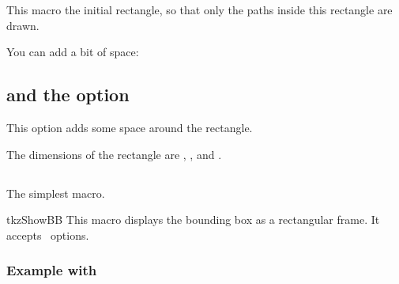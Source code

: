 This macro  the initial rectangle, so that only the paths inside this rectangle are drawn.

\begin{tkzexample}[latex=8cm,small]
\end{tkzexample} 

You can add a bit of space:
\begin{tkzltxexample}[]
  \tkzClip[space=1]
\end{tkzltxexample} 

\subsection{ and the option } 
This option adds some space around the  rectangle.
\begin{tkzexample}[latex=8cm,small]
\end{tkzexample}   
The dimensions of the  rectangle are , ,  and . 

\subsection{}
The simplest macro.
\begin{NewMacroBox}{tkzShowBB}{}%
This macro displays the bounding box as a rectangular frame. It accepts \TIKZ\ options.
\end{NewMacroBox} 


\subsubsection{Example with }
\begin{tkzexample}[latex=8cm,small]
\end{tkzexample}
